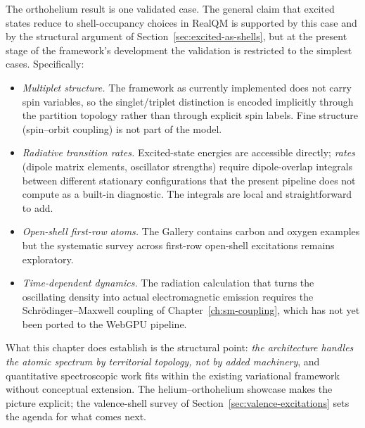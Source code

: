 The orthohelium result is one validated case. The general claim that excited states reduce to shell-occupancy choices in RealQM is supported by this case and by the structural argument of Section~\ref{sec:excited-as-shells}, but at the present stage of the framework's development the validation is restricted to the simplest cases. Specifically:

\begin{itemize}
\item \emph{Multiplet structure.} The framework as currently implemented does not carry spin variables, so the singlet/triplet distinction is encoded implicitly through the partition topology rather than through explicit spin labels. Fine structure (spin--orbit coupling) is not part of the model.
\item \emph{Radiative transition rates.} Excited-state energies are accessible directly; \emph{rates} (dipole matrix elements, oscillator strengths) require dipole-overlap integrals between different stationary configurations that the present pipeline does not compute as a built-in diagnostic. The integrals are local and straightforward to add.
\item \emph{Open-shell first-row atoms.} The Gallery contains carbon and oxygen examples but the systematic survey across first-row open-shell excitations remains exploratory.
\item \emph{Time-dependent dynamics.} The radiation calculation that turns the oscillating density into actual electromagnetic emission requires the Schr\"odinger--Maxwell coupling of Chapter~\ref{ch:sm-coupling}, which has not yet been ported to the WebGPU pipeline.
\end{itemize}

What this chapter does establish is the structural point: \emph{the architecture handles the atomic spectrum by territorial topology, not by added machinery}, and quantitative spectroscopic work fits within the existing variational framework without conceptual extension. The helium--orthohelium showcase makes the picture explicit; the valence-shell survey of Section~\ref{sec:valence-excitations} sets the agenda for what comes next.

